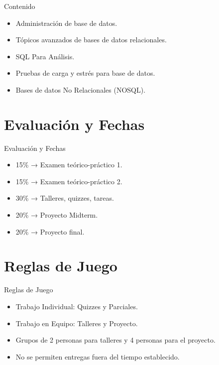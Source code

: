 \documentclass{beamer}
\begin{document}
\begin{frame}{Contenido}
\begin{itemize}
    \item Administración de base de datos.
    \item Tópicos avanzados de bases de datos relacionales.
    \item SQL Para Análisis.
    \item Pruebas de carga y estrés para base de datos.
    \item Bases de datos No Relacionales (NOSQL).
\end{itemize}
\end{frame}

\section{Evaluación y Fechas}

\begin{frame}{Evaluación y Fechas}
    \begin{itemize}
        \item 15\% → Examen teórico-práctico 1.
        \item 15\% → Examen teórico-práctico 2.
        \item 30\% → Talleres, quizzes, tareas.
        \item 20\% → Proyecto Midterm.
        \item 20\% → Proyecto final.
    \end{itemize}
\end{frame}

\section{Reglas de Juego}

\begin{frame}{Reglas de Juego}
\begin{itemize}
    \item Trabajo Individual: Quizzes y Parciales.
    \item Trabajo en Equipo: Talleres y Proyecto.
    \item Grupos de 2 personas para talleres y 4 personas para el proyecto.
    \item No se permiten entregas fuera del tiempo establecido.
\end{itemize}
\end{frame}
\end{document}
